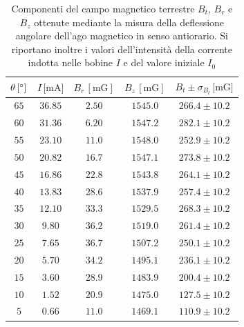 \documentclass[]{article}
\begin{document}
\begin{table}[H]
    \centering

\begin{tabular}{||c|c|c|c|c||}
    \hline
    $\theta\, [\text{\degree}] $ & $I\, \text{[mA]} $ & $B_r\, [\text{mG}] $ & $B_z\, [\text{mG}] $ & $B_t \pm \sigma_{B_t}\, \text{[mG]} $\\
    \hline\hline

    $65$ & $36.85$ & $2.50$ & $1545.0$ & $266.4 \pm 10.2$ \\\hline
    $60$ & $31.36$ & $6.20$ & $1547.2$ & $282.1 \pm 10.2$ \\\hline
    $55$ & $23.10$ & $11.0$ & $1548.0$ & $252.9 \pm 10.2$ \\\hline
    $50$ & $20.82$ & $16.7$ & $1547.1$ & $273.8 \pm 10.2$ \\\hline
    $45$ & $16.86$ & $22.8$ & $1543.8$ & $264.1 \pm 10.2$ \\\hline
    $40$ & $13.83$ & $28.6$ & $1537.9$ & $257.4 \pm 10.2$ \\\hline
    $35$ & $12.10$ & $33.3$ & $1529.5$ & $268.3 \pm 10.2$ \\\hline
    $30$ & $ 9.80$ & $36.2$ & $1519.0$ & $261.4 \pm 10.2$ \\\hline
    $25$ & $ 7.65$ & $36.7$ & $1507.2$ & $250.1 \pm 10.2$ \\\hline
    $20$ & $ 5.70$ & $34.2$ & $1495.1$ & $236.1 \pm 10.2$ \\\hline
    $15$ & $ 3.60$ & $28.9$ & $1483.9$ & $200.4 \pm 10.2$ \\\hline
    $10$ & $ 1.52$ & $20.9$ & $1475.0$ & $127.5 \pm 10.2$ \\\hline
    $5 $ & $ 0.66$ & $11.0$ & $1469.1$ & $110.9 \pm 10.2$ \\\hline

\end{tabular}
\caption{Componenti del campo magnetico terrestre $B_t$, $B_r$ e $B_z$ ottenute mediante la misura della deflessione angolare dell'ago magnetico in senso antiorario. Si riportano inoltre i valori dell'intensità della corrente indotta nelle bobine $I$ e del valore iniziale $I_0$}
\label{campomagneticoterrestre_sensoantiorario}
\end{table}
\newpage
\end{document}
